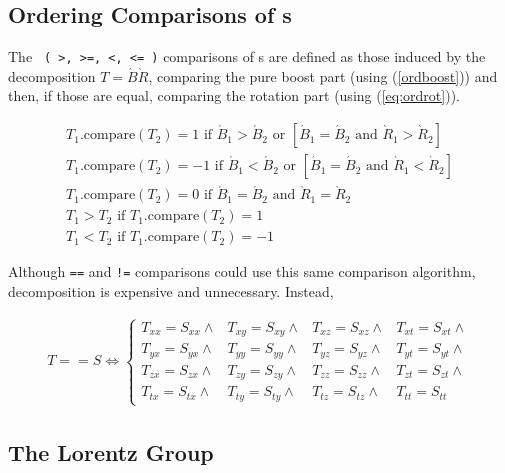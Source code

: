 \subsection{Ordering Comparisons of \protect\LT s}

The \verb$ ( >, >=, <, <= )$ comparisons of \LT s are defined as those
induced by the decomposition $ T = \acute{B} \grave{R} $,
comparing the pure boost part
(using (\ref{ordboost})) and
then, if those are equal, comparing the rotation part (using (\ref{eq:ordrot})).

\begin{eqnarray}
\label{eq:ltorder}
  T_1\mbox{.compare}(T_2) = 1 \mbox{ if }
	\acute{B}_1 > \acute{B}_2 \mbox { or } \left[
	\acute{B}_1 = \acute{B}_2 \mbox { and }
	\grave{R}_1 > \grave{R}_2 \right] \\
\nonumber
  T_1\mbox{.compare}(T_2) = -1 \mbox{ if }
	\acute{B}_1 < \acute{B}_2 \mbox { or } \left[
	\acute{B}_1 = \acute{B}_2 \mbox { and }
	\grave{R}_1 < \grave{R}_2 \right] \\
\nonumber
  T_1\mbox{.compare}(T_2) = 0 \mbox{ if }
	\acute{B}_1 = \acute{B}_2 \mbox { and } 
	\grave{R}_1 = \grave{R}_2 
		\\
  T_1  > T_2 \mbox{ if } T_1\mbox{.compare}(T_2) = 1 \\
\nonumber
  T_1  < T_2 \mbox{ if } T_1\mbox{.compare}(T_2) = -1 
\end{eqnarray}

Although \verb$==$ and \verb$!=$ comparisons could use this same comparison
algorithm, decomposition is expensive and unnecessary.  Instead,

\begin{eqnarray}
\label{eq:ltexact}
  T == S  \Longleftrightarrow 
  \left\{
  \begin{array}{cccc}  
  T_{xx} = S_{xx} \wedge & T_{xy} = S_{xy} \wedge &
  T_{xz} = S_{xz} \wedge & T_{xt} = S_{xt} \wedge \\
  T_{yx} = S_{yx} \wedge & T_{yy} = S_{yy} \wedge &
  T_{yz} = S_{yz} \wedge & T_{yt} = S_{yt} \wedge \\
  T_{zx} = S_{zx} \wedge & T_{zy} = S_{zy} \wedge &
  T_{zz} = S_{zz} \wedge & T_{zt} = S_{zt} \wedge \\
  T_{tx} = S_{tx} \wedge & T_{ty} = S_{ty} \wedge &
  T_{tz} = S_{tz} \wedge & T_{tt} = S_{tt} 
  \end{array}
  \right.
\end{eqnarray}

\subsection{The Lorentz Group}

